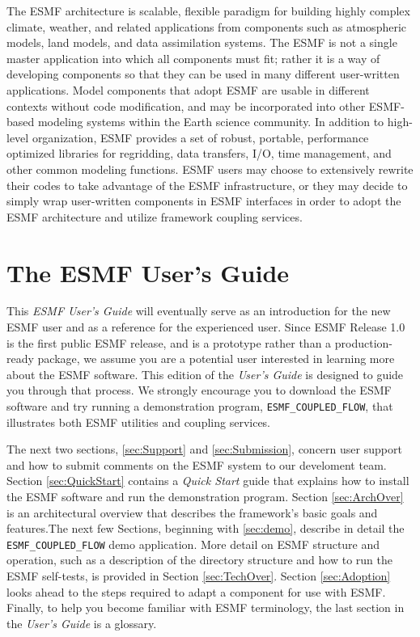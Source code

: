 The ESMF architecture is scalable, flexible paradigm for building highly 
complex climate, weather, and related applications from components such
as atmospheric models, land models, and data assimilation systems.  The 
ESMF is not a single master application into which all components must fit; 
rather it is a way of developing components so that they can be used 
in many different user-written applications.  Model components that adopt 
ESMF are usable in different contexts without code modification, and may be
incorporated into other ESMF-based modeling systems within the Earth 
science community.  In addition to high-level organization, ESMF provides 
a set of robust, portable, performance optimized libraries for regridding, 
data transfers, I/O, time management, and other common modeling functions.  
ESMF users may choose to extensively rewrite their codes to take advantage 
of the ESMF infrastructure, or they may decide to simply wrap user-written 
components in ESMF interfaces in order to adopt the ESMF architecture and 
utilize framework coupling services.

\section{The ESMF User's Guide}

This {\it ESMF User's Guide} will eventually serve as an introduction for the 
new ESMF user and as a reference for the experienced user.  Since ESMF 
Release 1.0 is the first public ESMF release, and is a prototype rather than 
a production-ready package, we assume you are a potential user interested in 
learning more about the ESMF software.  This edition of the {\it User's Guide} 
is designed to guide you through that process.  We strongly encourage you
to download the ESMF software and try running a demonstration program, 
{\tt ESMF\_COUPLED\_FLOW}, that illustrates both ESMF utilities and coupling
services.

The next two sections, \ref{sec:Support} and \ref{sec:Submission}, concern 
user support and how to submit comments on the ESMF system to our develoment 
team.  Section \ref{sec:QuickStart} contains a {\it Quick Start} guide that 
explains how to install the ESMF software and 
run the demonstration program.  Section \ref{sec:ArchOver} is an 
architectural overview that describes the framework's basic goals and features.The next few Sections, beginning with \ref{sec:demo}, describe in detail
the {\tt ESMF\_COUPLED\_FLOW} demo application.    
More detail on ESMF structure and operation, such as a description of the 
directory structure and how to run the ESMF self-tests, is provided in Section 
\ref{sec:TechOver}.  Section \ref{sec:Adoption} looks ahead to the steps 
required to adapt a component for use with ESMF.  Finally, to help you become 
familiar with ESMF terminology, the last section in the {\it User's Guide} is 
a glossary.  

